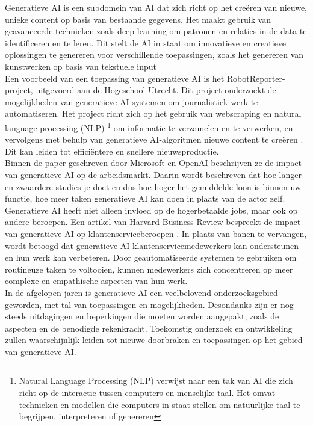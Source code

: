 Generatieve AI is een subdomein van AI dat zich richt op het creëren van nieuwe, unieke content op basis van bestaande gegevens. Het maakt gebruik van geavanceerde technieken zoals deep learning om patronen en relaties in de data te identificeren en te leren. Dit stelt de AI in staat om innovatieve en creatieve oplossingen te genereren voor verschillende toepassingen, zoals het genereren van kunstwerken op basis van tekstuele input \autocite{SonixAI2021}\\

Een voorbeeld van een toepassing van generatieve AI is het RobotReporter-project, uitgevoerd aan de Hogeschool Utrecht. Dit project onderzoekt de mogelijkheden van generatieve AI-systemen om journalistiek werk te automatiseren. Het project richt zich op het gebruik van webscraping en natural language processing (NLP) \footnote{Natural Language Processing (NLP) verwijst naar een tak van AI die zich richt op de interactie tussen computers en menselijke taal. Het omvat technieken en modellen die computers in staat stellen om natuurlijke taal te begrijpen, interpreteren of genereren} om informatie te verzamelen en te verwerken, en vervolgens met behulp van generatieve AI-algoritmen nieuwe content te creëren \autocite{HU2021}. Dit kan leiden tot efficiëntere en snellere nieuwsproductie. \\

Binnen de paper geschreven door Microsoft en OpenAI beschrijven ze de impact van generatieve AI op de arbeidsmarkt. Daarin wordt beschreven dat hoe langer en zwaardere studies je doet en dus hoe hoger het gemiddelde loon is binnen uw functie, hoe meer taken generatieve AI kan doen in plaats van de actor zelf. \autocite{gpt_micai} \\ 

Generatieve AI heeft niet alleen invloed op de hogerbetaalde jobs, maar ook op andere beroepen. Een artikel van Harvard Business Review bespreekt de impact van generatieve AI op klantenserviceberoepen \autocite{HBR2023}. In plaats van banen te vervangen, wordt betoogd dat generatieve AI klantenservicemedewerkers kan ondersteunen en hun werk kan verbeteren. Door geautomatiseerde systemen te gebruiken om routineuze taken te voltooien, kunnen medewerkers zich concentreren op meer complexe en empathische aspecten van hun werk. \\

In de afgelopen jaren is generatieve AI een veelbelovend onderzoeksgebied geworden, met tal van toepassingen en mogelijkheden. Desondanks zijn er nog steeds uitdagingen en beperkingen die moeten worden aangepakt, zoals de  aspecten en de benodigde rekenkracht. Toekomstig onderzoek en ontwikkeling zullen waarschijnlijk leiden tot nieuwe doorbraken en toepassingen op het gebied van generatieve AI. \\

